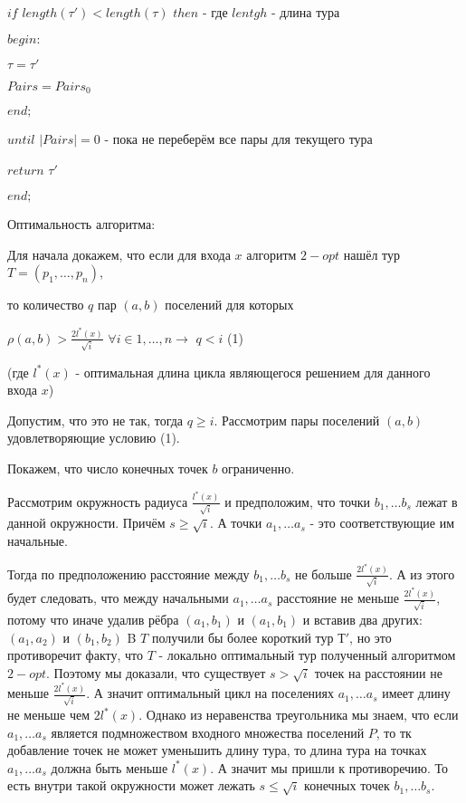 \documentclass[a4paper,12pt]{article}
\begin{document}
$if$ $length(\tau')<length(\tau)$ $then$ - где $lentgh$ - длина тура

$begin:$

$\tau = \tau'$

$Pairs = Pairs_0$

$end;$

$until$ $|Pairs|=0$ - пока не переберём все пары для текущего тура

$return$ $\tau'$

$end;$ 

Оптимальность алгоритма: 

Для начала докажем, что если для входа $x$ алгоритм $2-opt$  нашёл тур $T=(p_1, \dots, p_n)$, 

то количество $q$ пар $(a,b)$ поселений для которых 

$\rho(a,b)>\frac{2 l^*(x)}{\sqrt{i}}$ $\forall i \in 1, \dots, n \rightarrow$ $q<i$ (1)

(где $l^*(x)$ - оптимальная длина цикла являющегося решением для данного входа $x$)



Допустим, что это не так, тогда $q\geq i$. Рассмотрим пары поселений $(a, b)$ удовлетворяющие условию (1).

Покажем, что число конечных точек $b$ ограниченно.

Рассмотрим окружность радиуса $\frac{ l^*(x)}{\sqrt{i}}$ и предположим, что точки $b_1, \dots b_s$ лежат в данной окружности. Причём $s\geq\sqrt{i}$. А точки $a_1, \dots a_s$ - это соответствующие им начальные. 

Тогда по предположению расстояние между $b_1, \dots b_s$ не больше $\frac{2 l^*(x)}{\sqrt{i}}$. А из этого будет следовать, что между начальными $a_1, \dots a_s$ расстояние не меньше $\frac{2 l^*(x)}{\sqrt{i}}$, потому что иначе удалив рёбра $(a_1, b_1)$ и $(a_1, b_1)$ и вставив два других: $(a_1, a_2)$ и $(b_1, b_2)$ B $T$ получили бы более короткий тур $Т'$, но это противоречит факту, что $T$ - локально оптимальный тур полученный алгоритмом $2-opt$. Поэтому мы доказали, что существует $s>\sqrt{i}$ точек на расстоянии не меньше  $\frac{2 l^*(x)}{\sqrt{i}}$. А значит оптимальный цикл на поселениях $a_1, \dots a_s$ имеет длину не меньше чем $2l^*(x)$. Однако из неравенства треугольника мы знаем, что если $a_1, \dots a_s$ является подмножеством входного множества поселений $P$, то тк добавление точек не может уменьшить длину тура, то длина тура на точках $a_1, \dots a_s$ должна быть меньше $l^*(x)$. А значит мы пришли к противоречию. То есть внутри такой окружности может лежать $s\leq\sqrt{i}$ конечных точек $b_1, \dots b_s$.
\end{document}
